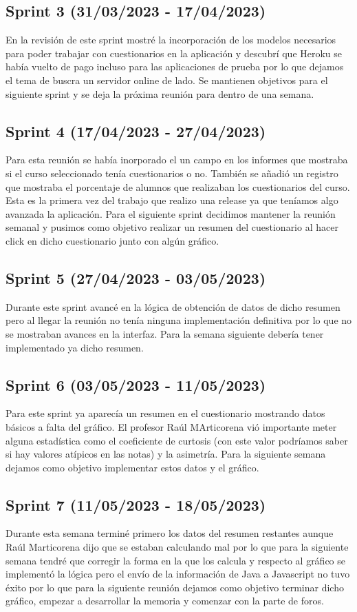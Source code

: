 \subsection{Sprint 3 (31/03/2023 - 17/04/2023)}
	En la revisión de este sprint mostré la incorporación de los modelos necesarios para poder trabajar con cuestionarios en la aplicación y descubrí que Heroku se había vuelto de pago incluso para las aplicaciones de prueba por lo que dejamos el tema de buscra un servidor online de lado. Se mantienen objetivos para el siguiente sprint y se deja la próxima reunión para dentro de una semana.

\subsection{Sprint 4 (17/04/2023 - 27/04/2023)}
	Para esta reunión se había inorporado el un campo en los informes que mostraba si el curso seleccionado tenía cuestionarios o no. También se añadió un registro que mostraba el porcentaje de alumnos que realizaban los cuestionarios del curso. Esta es la primera vez del trabajo que realizo una release ya que teníamos algo avanzada la aplicación. Para el siguiente sprint decidimos mantener la reunión semanal y pusimos como objetivo realizar un resumen del cuestionario al hacer click en dicho cuestionario junto con algún gráfico.

\subsection{Sprint 5 (27/04/2023 - 03/05/2023)}
	Durante este sprint avancé en la lógica de obtención de datos de dicho resumen pero al llegar la reunión no tenía ninguna implementación definitiva por lo que no se mostraban avances en la interfaz. Para la semana siguiente debería tener implementado ya dicho resumen.

\subsection{Sprint 6 (03/05/2023 - 11/05/2023)}
	Para este sprint ya aparecía un resumen en el cuestionario mostrando datos básicos a falta del gráfico. El profesor Raúl MArticorena vió importante meter alguna estadística como el coeficiente de curtosis (con este valor podríamos saber si hay valores atípicos en las notas) y la asimetría. Para la siguiente semana dejamos como objetivo implementar estos datos y el gráfico.

\subsection{Sprint 7 (11/05/2023 - 18/05/2023)}
	Durante esta semana terminé primero los datos del resumen restantes aunque Raúl Marticorena dijo que se estaban calculando mal por lo que para la siguiente semana tendré que corregir la forma en la que los calcula y respecto al gráfico se implementó la lógica pero el envío de la información de Java a Javascript no tuvo éxito por lo que para la siguiente reunión dejamos como objetivo terminar dicho gráfico, empezar a desarrollar la memoria y comenzar con la parte de foros.